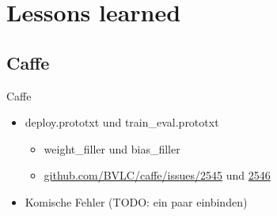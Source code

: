 \section{Lessons learned}

\subsection{Caffe}

\begin{frame}{Caffe}
    \begin{itemize}
        \item deploy.prototxt und train\_eval.prototxt
        \begin{itemize}
            \item weight\_filler und bias\_filler
            \item \href{https://github.com/BVLC/caffe/issues/2545}{github.com/BVLC/caffe/issues/2545}
                  und \href{https://github.com/BVLC/caffe/issues/2546}{2546}
        \end{itemize}
        \item Komische Fehler (TODO: ein paar einbinden)
    \end{itemize}
\end{frame}
